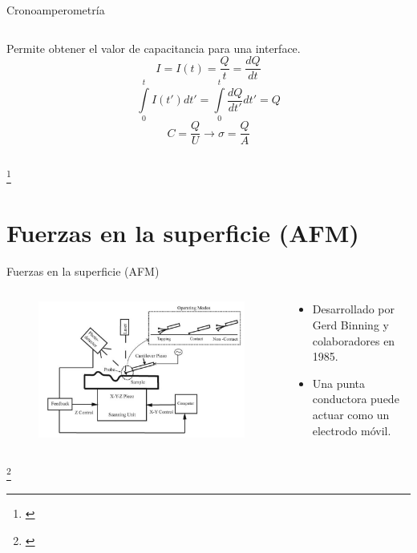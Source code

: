 \documentclass[handout]{beamer}
\newcommand\blfootnote[1]
{%
	\begingroup
	\renewcommand\thefootnote{}\footnote{#1}%
	\addtocounter{footnote}{-1}%
	\endgroup
}
\newcommand{\fcite}[1]{\blfootnote{\cite{#1}}}
\begin{document}
\begin{frame}{Cronoamperometr\'ia}
\begin{columns}
\begin{column}{0.6\textwidth}
			Permite obtener el valor de capacitancia para una interface.
			\begin{equation}
				I = I(t) = \dfrac{Q}{t} = \dfrac{dQ}{dt}
			\end{equation}
			\begin{equation}
				\int\limits_{0}^{t} I(t')dt' = \int\limits_{0}^{t}\dfrac{dQ}{dt'}dt' = Q
			\end{equation}
			\begin{equation}
				C = \dfrac{Q}{U} \longrightarrow \sigma = \dfrac{Q}{A}
			\end{equation}
		\end{column}
	\end{columns}
	\fcite{butt2006physics}
\end{frame}

\section{Fuerzas en la superficie (AFM)}
\begin{frame}{Fuerzas en la superficie (AFM)}
	\begin{columns}
		\begin{column}{0.6\textwidth}
			\begin{figure}[h]
				\centering
				\includegraphics[width=\linewidth]{sources/afm}
			\end{figure}
		\end{column}
		\begin{column}{0.4\textwidth}
			\begin{itemize}
				\item Desarrollado por Gerd Binning y colaboradores en 1985.
				\item Una punta conductora puede actuar como un electrodo m\'ovil.
			\end{itemize}
		\end{column}
	\end{columns}
	\fcite{avila2010electrical}
\end{frame}
\end{document}
